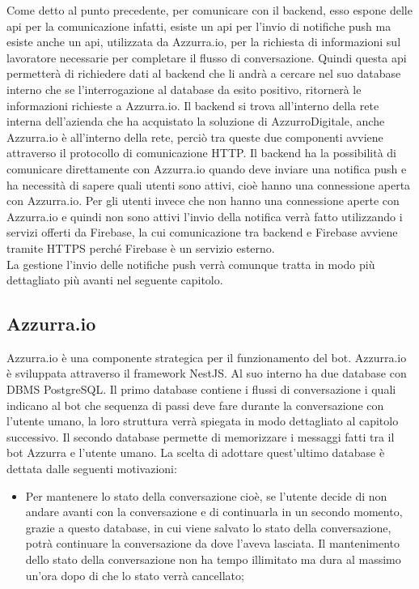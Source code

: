\begin{trivlist}
	Come detto al punto precedente, per comunicare con il backend, esso espone delle \gls{api}\ap{[g]} per la comunicazione infatti, esiste un \gls{api}\ap{[g]} per l'invio di notifiche push ma esiste anche un \gls{api}\ap{[g]}, utilizzata da Azzurra.io, per la richiesta di informazioni sul lavoratore necessarie per completare il flusso di conversazione. Quindi questa \gls{api}\ap{[g]} permetterà di richiedere dati al backend che li andrà a cercare nel suo database interno che se l'interrogazione al database da esito positivo, ritornerà le informazioni richieste a Azzurra.io. Il backend si trova all'interno della rete interna dell'azienda che ha acquistato la soluzione di AzzurroDigitale, anche Azzurra.io è all'interno della rete, perciò tra queste due componenti avviene attraverso il protocollo di comunicazione HTTP. Il backend ha la possibilità di comunicare direttamente con Azzurra.io quando deve inviare una notifica push e ha necessità di sapere quali utenti sono attivi, cioè hanno una connessione aperta con Azzurra.io. Per gli utenti invece che non hanno una connessione aperte con Azzurra.io e quindi non sono attivi l'invio della notifica verrà fatto utilizzando i servizi offerti da Firebase, la cui comunicazione tra backend e Firebase avviene tramite HTTPS perché Firebase è un servizio esterno.\\
	La gestione l'invio delle notifiche push verrà comunque tratta in modo più dettagliato più avanti nel seguente capitolo.
	\item \subsection{Azzurra.io}
	Azzurra.io è una componente strategica per il funzionamento del bot. Azzurra.io è sviluppata attraverso il framework NestJS. Al suo interno ha due database con DBMS PostgreSQL. Il primo database contiene i flussi di conversazione i quali indicano al bot che sequenza di passi deve fare durante la conversazione con l'utente umano, la loro struttura verrà spiegata in modo dettagliato al capitolo successivo. Il secondo database permette di memorizzare i messaggi fatti tra il bot Azzurra e l'utente umano. La scelta di adottare quest'ultimo database è dettata dalle seguenti motivazioni:
	\begin{itemize}
		\item Per mantenere lo stato della conversazione cioè, se l'utente decide di non andare avanti con la conversazione e di continuarla in un secondo momento, grazie a questo database, in cui viene salvato lo stato della conversazione, potrà continuare la conversazione da dove l'aveva lasciata. Il mantenimento dello stato della conversazione non ha tempo illimitato ma dura al massimo un'ora dopo di che lo stato verrà cancellato;

\end{itemize}
\end{trivlist}
